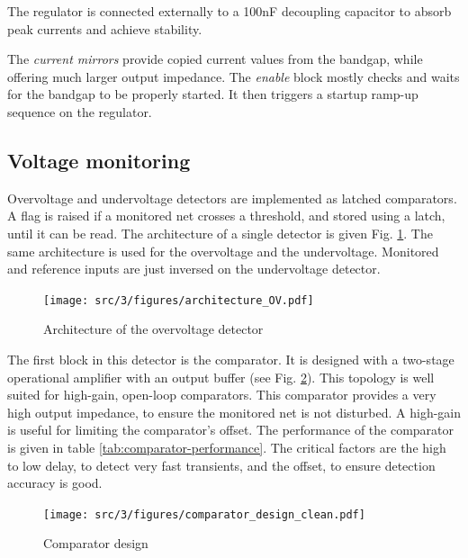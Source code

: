 The regulator is connected externally to a 100nF decoupling capacitor to absorb peak currents and achieve stability.

The \textit{current mirrors} provide copied current values from the bandgap, while offering much larger output impedance.
The \textit{enable} block mostly checks and waits for the bandgap to be properly started.
It then triggers a startup ramp-up sequence on the regulator.

\subsection{Voltage monitoring}

Overvoltage and undervoltage detectors are implemented as latched comparators.
A flag is raised if a monitored net crosses a threshold, and stored using a latch, until it can be read.
The architecture of a single detector is given Fig. \ref{fig:architecture-ov}.
The same architecture is used for the overvoltage and the undervoltage.
Monitored and reference inputs are just inversed on the undervoltage detector.

\begin{figure}[!htbp]
  \centering
  \texttt{[image: src/3/figures/architecture\_OV.pdf]}
  \caption{Architecture of the overvoltage detector}
  \label{fig:architecture-ov}
\end{figure}

The first block in this detector is the comparator.
It is designed with a two-stage operational amplifier with an output buffer (see Fig. \ref{fig:comparator-design}).
This topology is well suited for high-gain, open-loop comparators.
This comparator provides a very high output impedance, to ensure the monitored net is not disturbed.
A high-gain is useful for limiting the comparator's offset.
The performance of the comparator is given in table \ref{tab:comparator-performance}.
The critical factors are the high to low delay, to detect very fast transients, and the offset, to ensure detection accuracy is good.

\begin{figure}[!htbp]
  \centering
  \texttt{[image: src/3/figures/comparator\_design\_clean.pdf]}
  \caption{Comparator design}
  \label{fig:comparator-design}
\end{figure}

